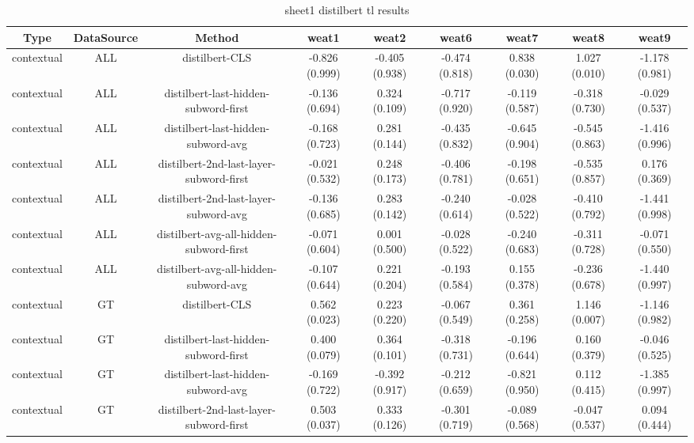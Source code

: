\begin{sidewaystable}[htb]
    \centering
    \caption{sheet1 distilbert tl results}
    \label{appendix_tab:sheet1_distilbert_tl_results}
    \small
    \begin{tabular}{@{}ccccccccc@{}}
        \toprule
        Type & DataSource & Method & weat1 & weat2 & weat6 & weat7 & weat8 & weat9 \\
        \midrule
        contextual & ALL & distilbert-CLS & -0.826 (0.999) & -0.405 (0.938) & -0.474 (0.818) & 0.838 (0.030) & 1.027 (0.010) & -1.178 (0.981) \\
        contextual & ALL & distilbert-last-hidden-subword-first & -0.136 (0.694) & 0.324 (0.109) & -0.717 (0.920) & -0.119 (0.587) & -0.318 (0.730) & -0.029 (0.537) \\
        contextual & ALL & distilbert-last-hidden-subword-avg & -0.168 (0.723) & 0.281 (0.144) & -0.435 (0.832) & -0.645 (0.904) & -0.545 (0.863) & -1.416 (0.996) \\
        contextual & ALL & distilbert-2nd-last-layer-subword-first & -0.021 (0.532) & 0.248 (0.173) & -0.406 (0.781) & -0.198 (0.651) & -0.535 (0.857) & 0.176 (0.369) \\
        contextual & ALL & distilbert-2nd-last-layer-subword-avg & -0.136 (0.685) & 0.283 (0.142) & -0.240 (0.614) & -0.028 (0.522) & -0.410 (0.792) & -1.441 (0.998) \\
        contextual & ALL & distilbert-avg-all-hidden-subword-first & -0.071 (0.604) & 0.001 (0.500) & -0.028 (0.522) & -0.240 (0.683) & -0.311 (0.728) & -0.071 (0.550) \\
        contextual & ALL & distilbert-avg-all-hidden-subword-avg & -0.107 (0.644) & 0.221 (0.204) & -0.193 (0.584) & 0.155 (0.378) & -0.236 (0.678) & -1.440 (0.997) \\
        contextual & GT & distilbert-CLS & 0.562 (0.023) & 0.223 (0.220) & -0.067 (0.549) & 0.361 (0.258) & 1.146 (0.007) & -1.146 (0.982) \\
        contextual & GT & distilbert-last-hidden-subword-first & 0.400 (0.079) & 0.364 (0.101) & -0.318 (0.731) & -0.196 (0.644) & 0.160 (0.379) & -0.046 (0.525) \\
        contextual & GT & distilbert-last-hidden-subword-avg & -0.169 (0.722) & -0.392 (0.917) & -0.212 (0.659) & -0.821 (0.950) & 0.112 (0.415) & -1.385 (0.997) \\
        contextual & GT & distilbert-2nd-last-layer-subword-first & 0.503 (0.037) & 0.333 (0.126) & -0.301 (0.719) & -0.089 (0.568) & -0.047 (0.537) & 0.094 (0.444) \\

\end{tabular}
\end{sidewaystable}

